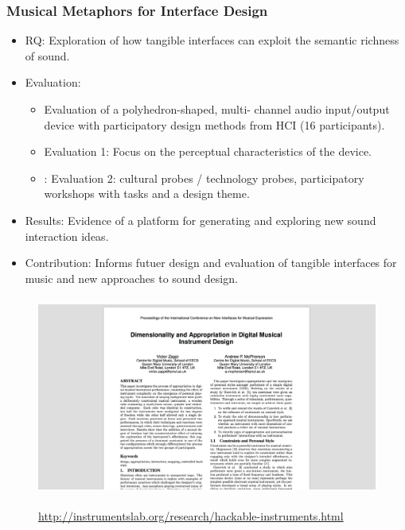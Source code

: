 \documentclass[screen, aspectratio=169]{beamer}
\begin{document}
%
\begin{frame}
\frametitle{Musical Metaphors for Interface Design}	
\begin{itemize}
\item RQ: Exploration of how tangible interfaces can exploit the semantic richness of sound.
\item Evaluation:
\begin{itemize}
\item Evaluation of a polyhedron-shaped, multi- channel audio input/output device with participatory design methods from HCI (16 participants).
\item Evaluation 1: Focus on the perceptual characteristics of the device.
\item: Evaluation 2: cultural probes / technology probes, participatory workshops with tasks and a design theme.
\end{itemize}
\item Results: Evidence of a platform for generating and exploring new sound interaction ideas.
\item Contribution: Informs futuer design and evaluation of tangible interfaces for music and new approaches to sound design.
\end{itemize}
\end{frame}
%
\begin{frame}
\frametitle{}
\begin{figure}
	\includegraphics[scale=0.31]{img/Zappi-McPherson-2014.png}\\
	    \cite{Zappi.McPherson.2014.NIME}\\
	       {\scriptsize  \url{http://instrumentslab.org/research/hackable-instruments.html}}
    \end{figure}		
\end{frame}
%
\end{document}
